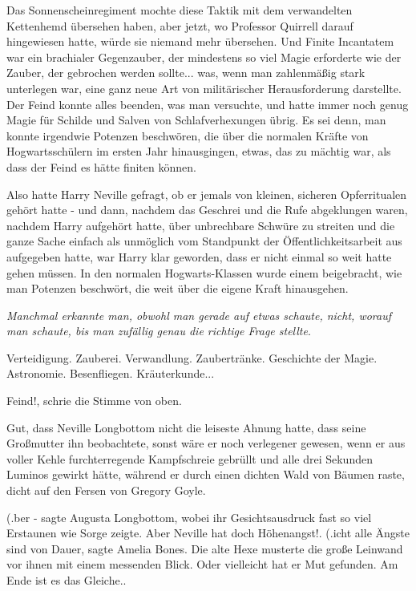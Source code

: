 Das Sonnenscheinregiment mochte diese Taktik mit dem verwandelten Kettenhemd
übersehen haben, aber jetzt, wo Professor Quirrell darauf hingewiesen hatte,
würde sie niemand mehr übersehen. Und Finite Incantatem war ein brachialer
Gegenzauber, der mindestens so viel Magie erforderte wie der Zauber, der
gebrochen werden sollte... was, wenn man zahlenmäßig stark unterlegen war, eine
ganz neue Art von militärischer Herausforderung darstellte. Der Feind konnte
alles beenden, was man versuchte, und hatte immer noch genug Magie für Schilde
und Salven von Schlafverhexungen übrig. Es sei denn, man konnte irgendwie
Potenzen beschwören, die über die normalen Kräfte von Hogwartsschülern im ersten
Jahr hinausgingen, etwas, das zu mächtig war, als dass der Feind es hätte
finiten können.

Also hatte Harry Neville gefragt, ob er jemals von kleinen, sicheren
Opferritualen gehört hatte - und dann, nachdem das Geschrei und die Rufe
abgeklungen waren, nachdem Harry aufgehört hatte, über unbrechbare Schwüre zu
streiten und die ganze Sache einfach als unmöglich vom Standpunkt der
Öffentlichkeitsarbeit aus aufgegeben hatte, war Harry klar geworden, dass er
nicht einmal so weit hatte gehen müssen. In den normalen Hogwarts-Klassen wurde
einem beigebracht, wie man Potenzen beschwört, die weit über die eigene Kraft
hinausgehen.

\emph{Manchmal erkannte man, obwohl man gerade auf etwas schaute, nicht, worauf
man schaute, bis man zufällig genau die richtige Frage stellte}.

Verteidigung. Zauberei. Verwandlung. Zaubertränke. Geschichte der Magie.
Astronomie. Besenfliegen. Kräuterkunde...

\glqq{}Feind!\grqq{}, schrie die Stimme von oben.

Gut, dass Neville Longbottom nicht die leiseste Ahnung hatte, dass seine
Großmutter ihn beobachtete, sonst wäre er noch verlegener gewesen, wenn er aus
voller Kehle furchterregende Kampfschreie gebrüllt und alle drei Sekunden
Luminos gewirkt hätte, während er durch einen dichten Wald von Bäumen raste,
dicht auf den Fersen von Gregory Goyle.

(\grqq{}.ber -\grqq{} sagte Augusta Longbottom, wobei ihr Gesichtsausdruck fast
so viel Erstaunen wie Sorge zeigte. \glqq{}Aber Neville hat doch
Höhenangst!\grqq{}. (\grqq{}.icht alle Ängste sind von Dauer\grqq{}, sagte
Amelia Bones. Die alte Hexe musterte die große Leinwand vor ihnen mit einem
messenden Blick. \glqq{}Oder vielleicht hat er Mut gefunden. Am Ende ist es das
Gleiche.\grqq{}.

